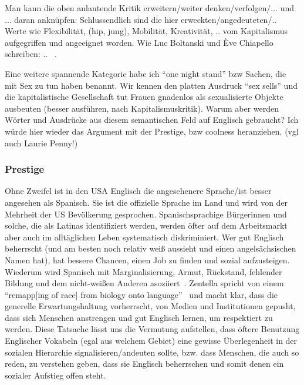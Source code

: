 
Man kann die oben anlautende Kritik erweitern/weiter denken/verfolgen/... und ... daran anknüpfen:
Schlussendlich sind die hier erweckten/angedeuteten/.. Werte wie Flexibilität, (hip, jung), Mobilität, Kreativität, .. vom Kapitalismus aufgegriffen und angeeignet worden.
Wie Luc Boltanski und Ève Chiapello schreiben: .. ~\cite[]{BolChi07}.

Eine weitere spannende Kategorie habe ich ``one night stand'' bzw Sachen, die mit Sex zu tun haben benannt.
Wir kennen den platten Ausdruck ``sex sells'' und die kapitalistische Gesellschaft tut Frauen gnadenlos als sexualisierte Objekte ausbeuten (besser ausführen, nach Kapitalismuskritik).
Warum aber werden Wörter und Ausdrücke aus diesem semantischen Feld auf Englisch gebraucht?
Ich würde hier wieder das Argument mit der Prestige, bzw coolness heranziehen. (vgl auch Laurie Penny!)


\subsubsection{Prestige}
Ohne Zweifel ist in den USA Englisch die angesehenere Sprache/ist besser angesehen als Spanisch.
Sie ist die offizielle Sprache im Land und wird von der Mehrheit der US Bevölkerung gesprochen.
Spanischsprachige Bürgerinnen und solche, die als Latinas identifiziert werden, werden öfter auf dem Arbeitsmarkt aber auch im alltäglichen Leben systematisch diskriminiert.
Wer gut Englisch beherrscht (und am besten noch relativ weiß aussieht und einen angelsächsischen Namen hat), hat bessere Chancen, einen Job zu finden und sozial aufzusteigen.
Wiederum wird Spanisch mit Marginalisierung, Armut, Rückstand, fehlender Bildung und dem nicht-weißen Anderen asoziiert~\cite{Zentella07}. %
Zentella spricht von einem ``remapp[ing of race] from biology onto language''~\cite{Zentella07}
und macht klar, dass die generelle Erwartungshaltung vorherrscht, von Medien und Institutionen gepusht, dass sich Menschen anstrengen und gut Englisch lernen, um respektiert zu werden.
Diese Tatsache lässt uns die Vermutung aufstellen, dass öftere Benutzung Englischer Vokabeln (egal aus welchem Gebiet) eine gewisse Überlegenheit in der sozialen Hierarchie signalisieren/andeuten sollte, bzw. dass Menschen, die auch so reden, zu verstehen geben, dass sie Englisch beherrschen und somit denen ein sozialer Aufstieg offen steht.

